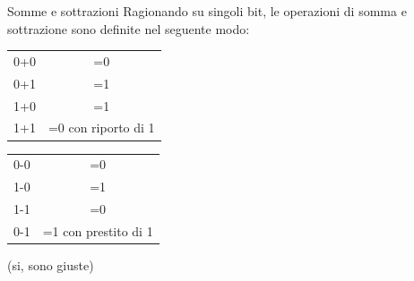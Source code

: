 \documentclass[handout]{beamer}
\begin{document}
\begin{frame}{Somme e sottrazioni}
Ragionando su singoli bit, le operazioni di somma e sottrazione sono definite nel seguente modo:

\begin{table}[h]
	\begin{tabular}{c|c}
		0+0 & =0 \\
		0+1 & =1 \\
		1+0 & =1 \\
		1+1 & =0 con riporto di 1
	\end{tabular}
\end{table}
\begin{table}[h]
	\begin{tabular}{c|c}
		0-0 & =0 \\
		1-0 & =1 \\
		1-1 & =0 \\
		0-1 & =1 con prestito di 1
	\end{tabular}
\end{table}

(si, sono giuste)
\end{frame}
\end{document}
